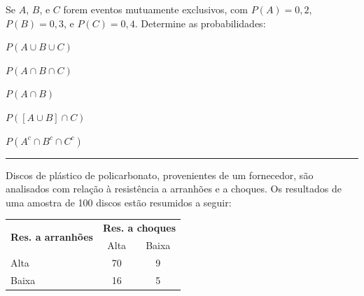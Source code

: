 \documentclass[a4paper,11pt,fleqn]{article}\usepackage[]{graphicx}\usepackage[]{color}
\theoremstyle{definition}
\begin{document}
\begin{compactenum}
\item Se $A$, $B$, e $C$ forem eventos mutuamente exclusivos, com $P(A)
  = 0,2$, $P(B) = 0,3$, e $P(C) = 0,4$. Determine as
  probabilidades: \\
    \begin{inparaenum}
    \item $P(A \cup B \cup C)$ \,
    \item $P(A \cap B \cap C)$ \,
    \item $P(A \cap B)$ \,
    \item $P([A \cup B] \cap C)$ \,
    \item $P(A^c \cap B^c \cap C^c)$
    \end{inparaenum}

\vspace{0.3cm}
\hrule
\vspace{0.3cm}

\item Discos de plástico de policarbonato, provenientes de um fornecedor,
  são analisados com relação à resistência a arranhões e a choques. Os
  resultados de uma amostra de 100 discos estão resumidos a seguir:
  \begin{table}[!h]
    \centering
    \begin{tabular}{lcc}
      \hline
      \multirow{2}{*}{\textbf{Res. a arranhões}}
      & \multicolumn{2}{l}{\textbf{Res. a choques}} \\
      \cline{2-3}
                & Alta         & Baixa       \\
      \hline
      Alta      & 70           & 9           \\
      Baixa     & 16           & 5           \\
      \hline
    \end{tabular}
  \end{table}


\end{compactenum}
\end{document}
